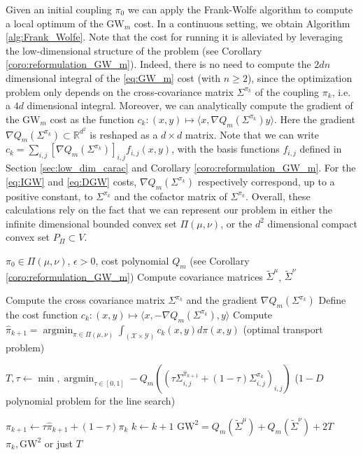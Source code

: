 \documentclass{article}
\newcommand{\R}{\mathbb{R}}
\newcommand{\Y}{\mathcal{Y}}
\newcommand{\X}{\mathcal{X}}
\newcommand{\1}{\mathbf{1}}
\newcommand{\GW}{\mathrm{GW}}
\DeclareMathOperator*{\argmin}{argmin}
\theoremstyle{definition}
\theoremstyle{remark}
\begin{document}
Given an initial coupling $\pi_0$ we can apply the Frank-Wolfe algorithm
\cite{frank1956algorithm} to compute a local optimum of the  $\GW_m$ cost. In a continuous setting, we obtain Algorithm \ref{alg:Frank_Wolfe}. Note that the cost for running it is alleviated by leveraging the low-dimensional structure of the problem (see Corollary \ref{coro:reformulation_GW_m}). Indeed, there is no need to compute the $2dn$ dimensional integral of the  \ref{eq:GW_m} cost (with $n\geq 2$), since the optimization problem only depends on the cross-covariance matrix $\Sigma^{\pi_k}$ of the coupling $\pi_k$, i.e. a $4d$ dimensional integral. Moreover, we can analytically compute the gradient of the $\GW_m$ cost as the function $c_k:(x,y)\mapsto \langle  x, \nabla Q_m(\Sigma^{\pi_k})  y\rangle $. Here the gradient $\nabla Q_m(\Sigma^{\pi_k})\subset \R^{d^2}$ is reshaped as a $d\times d$ matrix. Note that  we can write  $c_k= \sum_{i,j}  [\nabla Q_m(\Sigma^{\pi_k})]_{i,j}f_{i,j}(x,y)$, with the basis functions $f_{i,j}$ defined in Section \ref{sec:low_dim_carac} and Corollary \ref{coro:reformulation_GW_m}. For the \ref{eq:IGW} and \ref{eq:DGW} costs, $\nabla Q_m(\Sigma^{\pi_k})$ respectively correspond, up to a positive constant, to $\Sigma^{\pi_k}$ and the cofactor matrix of $\Sigma^{\pi_k}$. Overall, these calculations rely on the fact that we can represent our problem in
either the infinite dimensional  bounded convex set $\Pi(\mu,\nu)$,  or the $d^2$ dimensional compact convex set $P_\Pi\subset V$. 



\begin{algorithm}
\caption{Frank-Wolfe algorithm for $\GW_m$}\label{alg:Frank_Wolfe}
\begin{algorithmic}[1]
\Require $\pi_0 \in\Pi(\mu,\nu)$, $ \epsilon>0 $, cost polynomial $Q_m$ (see Corollary \ref{coro:reformulation_GW_m})
\State Compute covariance matrices $\tilde{\Sigma}^{\mu}$, $\tilde{\Sigma}^{\nu}$ 

    
    \State Compute the cross covariance matrix $\Sigma^{\pi_k}$ and the gradient $\nabla Q_m(\Sigma^{\pi_k})$ 
    \State Define the cost function $c_k:(x,y)\mapsto \langle  x,-\nabla Q_m(\Sigma^{\pi_k}),y\rangle$
    \State Compute $\hat{\pi}_{k+1}=\argmin_{\pi\in\Pi(\mu,\nu)}\int_{(\X\times\Y)} c_k(x,y) d\pi(x,y)$ (optimal transport problem) \label{alg_fw_ot}

        
        \State $T, \tau\gets\min,\argmin_{\tau\in[0,1]} -Q_m((\tau\Sigma_{i,j}^{\hat{\pi}_{k+1}}+(1-\tau)\Sigma_{i,j}^{\pi_k})_{i,j})$ ($1-D$ polynomial problem for the line search)
        

        
        \State $\pi_{k+1}\gets \tau\hat{\pi}_{k+1}+(1-\tau)\pi_{k}$
        \State $k \leftarrow k + 1$
    \EndWhile
\State $\GW^2=Q_m(\tilde{\Sigma}^{\mu})+Q_m(\tilde{\Sigma}^{\nu})+2T$
\State\Return $\pi_k, \GW^2$ or just $T$
\end{algorithmic}
\end{algorithm}
\end{document}
